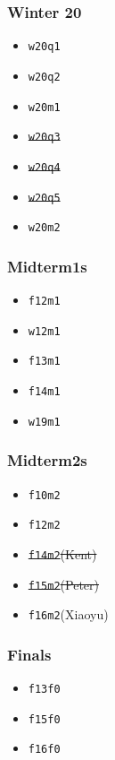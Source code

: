 \begin{minipage}[t]{0.24\textwidth}
    \subsubsection*{Winter 20}
    \begin{itemize}
        \item \texttt{w20q1}
        \item \texttt{w20q2}
        \item \texttt{w20m1}
        \item \st{\texttt{w20q3}}
        \item \st{\texttt{w20q4}}
        \item \st{\texttt{w20q5}}
        \item \texttt{w20m2}
    \end{itemize}
\end{minipage}
\begin{minipage}[t]{0.24\textwidth}
    \subsubsection*{Midterm1s}
    \begin{itemize}
        \item \texttt{f12m1}
        \item \texttt{w12m1}
        \item \texttt{f13m1}
        \item \texttt{f14m1}
        \item \texttt{w19m1}
    \end{itemize}    
\end{minipage}
\begin{minipage}[t]{0.24\textwidth}
    \subsubsection*{Midterm2s}
    \begin{itemize}
        \item \texttt{f10m2}
        \item \texttt{f12m2}
        \item \st{\texttt{f14m2}(Kent)}
        \item \st{\texttt{f15m2}(Peter)}
        \item \texttt{f16m2}(Xiaoyu)
    \end{itemize}    
\end{minipage}
\begin{minipage}[t]{0.24\textwidth}
    \subsubsection*{Finals}
    \begin{itemize}
        \item \texttt{f13f0}
        \item \texttt{f15f0}
        \item \texttt{f16f0}
    \end{itemize}
\end{minipage}